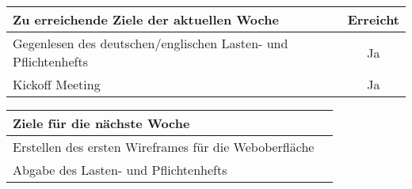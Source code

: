 \begin{tabularx}{\textwidth}{Xc}
    \arrayrulecolor{OliveGreen}
    \toprule
    {\bfseries Zu erreichende Ziele der aktuellen Woche} & {\bfseries Erreicht} \\
    \midrule[2pt]
    Gegenlesen des deutschen/englischen Lasten- und Pflichtenhefts  &Ja                    \\
    \rowcolor{OliveGreen!15}
    Kickoff Meeting                      &Ja                    \\
    
    \bottomrule[2pt]
\end{tabularx}
%
\vspace{1cm}
%
\begin{tabularx}{\textwidth}{Xc}
    \arrayrulecolor{OliveGreen}
    \toprule
    {\bfseries Ziele für die nächste Woche}              &                      \\
    \midrule[2pt]
    Erstellen des ersten Wireframes für die Weboberfläche       &                      \\
    \rowcolor{OliveGreen!15}
    Abgabe des Lasten- und Pflichtenhefts & \\
\end{tabularx}
